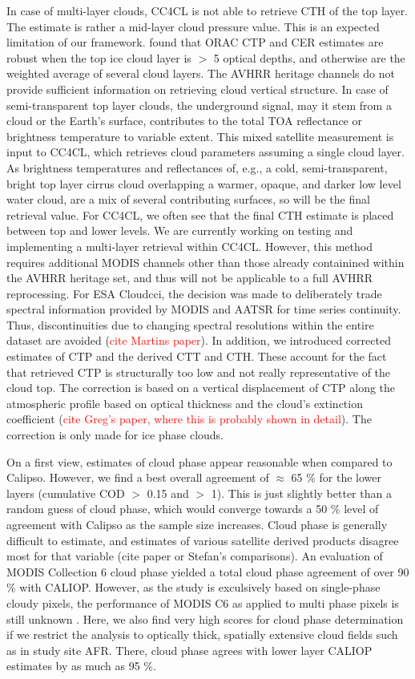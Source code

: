 In case of multi-layer clouds, CC4CL is not able to retrieve CTH of the top layer. The estimate is rather a mid-layer cloud pressure value. This is an expected limitation of our framework. \citet{Poulsen12} found that ORAC CTP and CER estimates are robust when the top ice cloud layer is $>$ 5 optical depths, and otherwise are the weighted average of several cloud layers. The AVHRR heritage channels do not provide sufficient information on retrieving cloud vertical structure. In case of semi-transparent top layer clouds, the underground signal, may it stem from a cloud or the Earth's surface, contributes to the total TOA reflectance or brightness temperature to variable extent. This mixed satellite measurement is input to CC4CL, which retrieves cloud parameters assuming a single cloud layer. As brightness temperatures and reflectances of, e.g., a cold, semi-transparent, bright top layer cirrus cloud overlapping a warmer, opaque, and darker low level water cloud, are a mix of several contributing surfaces, so will be the final retrieval value. For CC4CL, we often see that the final CTH estimate is placed between top and lower levels. We are currently working on testing and implementing a multi-layer retrieval within CC4CL. However, this method requires additional MODIS channels other than those already containined within the AVHRR heritage set, and thus will not be applicable to a full AVHRR reprocessing. For ESA Cloud\textunderscore cci, the decision was made to deliberately trade spectral information provided by MODIS and AATSR for time series continuity. Thus, discontinuities due to changing spectral resolutions within the entire dataset are avoided (\textcolor{red}{cite Martins paper}). In addition, we introduced corrected estimates of CTP and the derived CTT and CTH. These account for the fact that retrieved CTP is structurally too low and not really representative of the cloud top. The correction is based on a vertical displacement of CTP along the atmospheric profile based on optical thickness and the cloud's extinction coefficient (\textcolor{red}{cite Greg's paper, where this is probably shown in detail}). The correction is only made for ice phase clouds.

On a first view, estimates of cloud phase appear reasonable when compared to Calipso. However, we find a best overall agreement of $\approx$ 65 \% for the lower layers (cumulative COD $>$ 0.15 and $>$ 1). This is just slightly better than a random guess of cloud phase, which would converge towards a 50 \% level of agreement with Calipso as the sample size increases. Cloud phase is generally difficult to estimate, and estimates of various satellite derived products disagree most for that variable (cite paper or Stefan's comparisons). An evaluation of MODIS Collection 6 cloud phase yielded a total cloud phase agreement of over 90 \% with CALIOP. However, as the study is exculsively based on single-phase cloudy pixels, the performance of MODIS C6 as applied to multi phase pixels is still unknown \citep{Marchant16}. Here, we also find very high scores for cloud phase determination if we restrict the analysis to optically thick, spatially extensive cloud fields such as in study site AFR. There, cloud phase agrees with lower layer CALIOP estimates by as much as 95 \%. 

